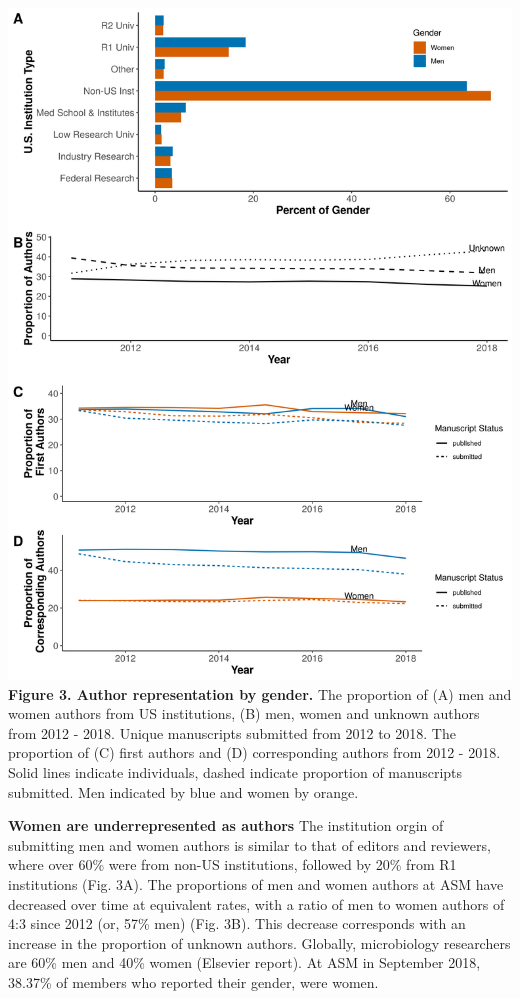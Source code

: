 \documentclass[11pt,]{article}
\begin{document}
\includegraphics{Figure_3.png} \textbf{Figure 3. Author representation
by gender.} The proportion of (A) men and women authors from US
institutions, (B) men, women and unknown authors from 2012 - 2018.
Unique manuscripts submitted from 2012 to 2018. The proportion of (C)
first authors and (D) corresponding authors from 2012 - 2018. Solid
lines indicate individuals, dashed indicate proportion of manuscripts
submitted. Men indicated by blue and women by orange.

\textbf{Women are underrepresented as authors} The institution orgin of
submitting men and women authors is similar to that of editors and
reviewers, where over 60\% were from non-US institutions, followed by
20\% from R1 institutions (Fig. 3A). The proportions of men and women
authors at ASM have decreased over time at equivalent rates, with a
ratio of men to women authors of 4:3 since 2012 (or, 57\% men) (Fig.
3B). This decrease corresponds with an increase in the proportion of
unknown authors. Globally, microbiology researchers are 60\% men and
40\% women (Elsevier report). At ASM in September 2018, 38.37\% of
members who reported their gender, were women.
\end{document}
